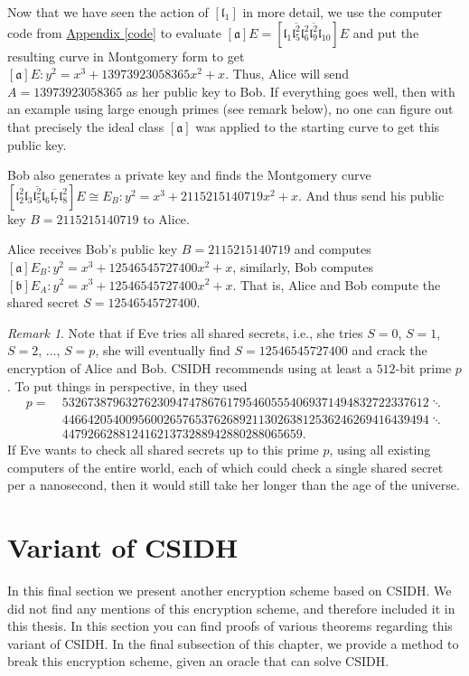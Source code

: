 \documentclass[openany, a4paper, 10pt]{book}
\theoremstyle{plain}
\theoremstyle{plain}
\theoremstyle{plain}
\theoremstyle{definition}
\theoremstyle{plain}
\theoremstyle{definition}
\theoremstyle{remark}
\newtheorem*{remark}{Remark}
\newcommand{\apref}[1]{\hyperref[#1]{Appendix \ref{#1}}}
\begin{document}
\begin{examplebox}
    Now that we have seen the action of $[\mathfrak l_1]$ in more detail, we use the computer code from \apref{code} to evaluate $[\mathfrak a]E=[\mathfrak l_1 \overline{\mathfrak l_5^2} \mathfrak l_6^2 \overline{\mathfrak l_9^2} \mathfrak l_{10}]E$ and put the resulting curve in Montgomery form to get $[\mathfrak a] E: y^2 = x^3 + 13973923058365x^2 + x$.
    Thus, Alice will send $A=13973923058365$ as her public key to Bob.
    If everything goes well, then with an example using large enough primes (see remark below), no one can figure out that precisely the ideal class $[\mathfrak a]$ was applied to the starting curve to get this public key.

    Bob also generates a private key and finds the Montgomery curve $[\mathfrak l_2^2 \mathfrak l_3 \overline{\mathfrak l_5^2} \mathfrak l_6 \overline{\mathfrak l_7} \mathfrak l_8^2]E \cong E_B: y^2 = x^3 + 2115215140719x^2 + x$.
    And thus send his public key $B=2115215140719$ to Alice.

    Alice receives Bob's public key $B=2115215140719$ and computes $[\mathfrak a]E_B: y^2 = x^3 + 12546545727400x^2 + x$, similarly, Bob computes $[\mathfrak b]E_A: y^2 = x^3+12546545727400x^2+x$.
    That is, Alice and Bob compute the shared secret $S=12546545727400$.
\end{examplebox}
\begin{remark}
    Note that if Eve tries all shared secrets, i.e., she tries $S=0$, $S=1$, $S=2$, $\dots$, $S=p$, she will eventually find $S=12546545727400$ and crack the encryption of Alice and Bob.
    CSIDH recommends using at least a $512$-bit prime $p$.
    To put things in perspective, in \cite[Section~8.1]{CSIDH} they used
    \vspace{-1em}
    \begin{align*}
        p =\ &5326738796327623094747867617954605554069371494832722337612 \ddots \\[-.9em]
            &4466420540095600265765376268921130263812536246269416439494 \ddots \\
            &44792662881241621373288942880288065659.
    \end{align*}
    If Eve wants to check all shared secrets up to this prime $p$, using all existing computers of the entire world, each of which could check a single shared secret per a nanosecond, then it would still take her longer than the age of the universe.
\end{remark}

\section{Variant of CSIDH}\label{gen_CSIDH}
In this final section we present another encryption scheme based on CSIDH.
We did not find any mentions of this encryption scheme, and therefore included it in this thesis.
In this section you can find proofs of various theorems regarding this variant of CSIDH.
In the final subsection of this chapter, we provide a method to break this encryption scheme, given an oracle that can solve CSIDH.
\end{document}
